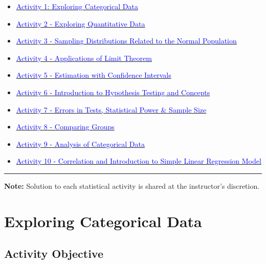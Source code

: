 \documentclass[oneside,openany]{book}
\providecommand{\tightlist}{%
  \setlength{\itemsep}{0pt}\setlength{\parskip}{0pt}}
\begin{document}
\begin{itemize}
\tightlist
\item
  \hyperref[activity-1---exploring-categorical-data]{\textcolor{blue}{Activity 1: Exploring Categorical Data}}
\item
  \hyperref[activity-2---exploring-quantitative-data]{\textcolor{blue}{Activity 2 - Exploring Quantitative Data}}
\item
  \hyperref[activity-3---sampling-distributions-related-to-the-normal-population]{\textcolor{blue}{Activity 3 - Sampling Distributions Related to the Normal Population}}
\item
  \hyperref[activity-4---applications-of-limit-theorem]{\textcolor{blue}{Activity 4 - Applications of Limit Theorem}}
\item
  \hyperref[activity-5---estimation-with-confidence-intervals]{\textcolor{blue}{Activity 5 - Estimation with Confidence Intervals}}
\item
  \hyperref[activity-6---introduction-to-hypothesis-testing-and-concepts]{\textcolor{blue}{Activity 6 - Introduction to Hypothesis Testing and Concepts}}
\item
  \hyperref[activity-7---errors-in-tests-statistical-power--sample-size]{\textcolor{blue}{Activity 7 - Errors in Tests, Statistical Power \& Sample Size}}
\item
  \hyperref[activity-8---comparing-groups]{\textcolor{blue}{Activity 8 - Comparing Groups}}
\item
  \hyperref[activity-9---analysis-of-categorical-data]{\textcolor{blue}{Activity 9 - Analysis of Categorical Data}}
\item
  \hyperref[activity-10---correlation-and-introduction-to-simple-linear-regression-model]{\textcolor{blue}{Activity 10 - Correlation and Introduction to Simple Linear Regression Model}}
\end{itemize}


\begin{center}\rule{0.5\linewidth}{0.5pt}\end{center}

\textbf{Note:} Solution to each statistical activity is shared at the instructor's discretion.

\chapter{Exploring Categorical Data}\label{activity-1---exploring-categorical-data}

\section{Activity Objective}
\end{document}
